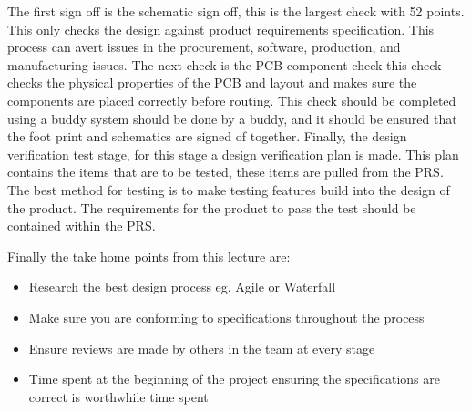 \documentclass{article}
\begin{document}
The first sign off is the schematic sign off, this is the largest check with 52 points. This only
checks the design against product requirements specification. This process can avert issues in the
procurement, software, production, and manufacturing issues. The next check is the PCB component 
check this check checks the physical properties of the PCB and layout and makes sure the
components are placed correctly before routing. This check should be completed using a buddy
system should be done by a buddy, and it should be ensured that the foot print and schematics are
signed of together. Finally, the design verification test stage, for this stage a design
verification plan is made. This plan contains the items that are to be tested, these items are
pulled from the PRS. The best method for testing is to make testing features build into the design
of the product. The requirements for the product to pass the test should be contained within the
PRS.

Finally the take home points from this lecture are:
\begin{itemize}

    \item{Research the best design process eg. Agile or Waterfall}

    \item{Make sure you are conforming to specifications throughout the process}

    \item{Ensure reviews are made by others in the team at every stage}

    \item{Time spent at the beginning of the project ensuring the specifications are correct is
        worthwhile time spent}

\end{itemize}
\end{document}
